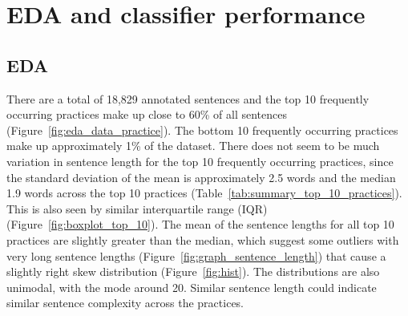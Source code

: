 
\chapter{EDA and classifier performance} %

\label{chapter3} %

\section{EDA}
There are a total of 18,829 annotated sentences and the top 10 frequently occurring practices make up close to 60\% of all sentences (Figure~\ref{fig:eda_data_practice}). The bottom 10 frequently occurring practices make up approximately 1\% of the dataset. There does not seem to be much variation in sentence length for the top 10 frequently occurring practices, since the standard deviation of the mean is approximately 2.5 words and the median 1.9 words across the top 10 practices (Table~\ref{tab:summary_top_10_practices}). This is also seen by similar interquartile range (IQR) (Figure~\ref{fig:boxplot_top_10}). The mean of the sentence lengths for all top 10 practices are slightly greater than the median, which suggest some outliers with very long sentence lengths (Figure~\ref{fig:graph_sentence_length}) that cause a slightly right skew distribution (Figure~\ref{fig:hist}). The distributions are also unimodal, with the mode around 20. Similar sentence length could indicate similar sentence complexity across the practices. 

